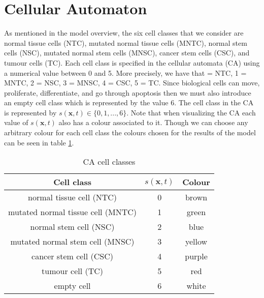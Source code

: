 \documentclass[\main/thesis.tex]{subfiles}
\begin{document}
\section{Cellular Automaton}
As mentioned in the model overview, the six cell classes that we consider are 
normal tissue cells (NTC), mutated normal tissue cells (MNTC), normal stem cells 
(NSC), mutated normal stem cells (MNSC), cancer stem cells (CSC), and tumour 
cells (TC). Each cell class is specified in the cellular automata (CA) using a 
numerical value between 0 and 5. More precisely, we have that  {=} NTC, 1 {=} MNTC, 2 {=} NSC, 3 {=} MNSC, 4 {=} CSC, 5 {=} TC.
Since biological cells can move, proliferate, differentiate, and go through 
apoptosis then we must also introduce an empty cell class which is represented 
by the value 6. The cell class in the CA is represented by 
$s(\boldsymbol{x}, t) {\in} \{ 0, 1, ..., 6  \}$. Note that when visualizing the CA each 
value of $s(\boldsymbol{x}, t)$ also has a colour associated to it. 
Though we can choose any arbitrary colour for each cell class the colours chosen for the 
results of the model can be seen in table \ref{table:CAStates}.
\begin{table}[H]
\centering	
\begin{tabular}{|c|c|c|}
	\hline
	Cell class & $s(\boldsymbol{x}, t)$ & Colour \\
	\hline
	normal tissue cell (NTC) & 0 & \cellcolor[RGB]{146, 111, 98} brown \\
	mutated normal tissue cell (MNTC) & 1 & \cellcolor[RGB]{50, 200, 118} green \\
	normal stem cell (NSC) & 2 & \cellcolor[RGB]{0, 84, 147} blue \\
	mutated normal stem cell (MNSC) & 3 & \cellcolor[RGB]{240, 200, 0} yellow \\
	cancer stem cell (CSC) & 4 & \cellcolor[RGB]{200, 62, 255} purple \\
	tumour cell (TC) & 5 & \cellcolor[RGB]{255, 61, 62} red \\
	empty cell & 6 & \cellcolor[RGB]{255, 255, 255} white \\
	\hline
\end{tabular}
\caption{CA cell classes}
\label{table:CAStates} 
\end{table}
\end{document}
